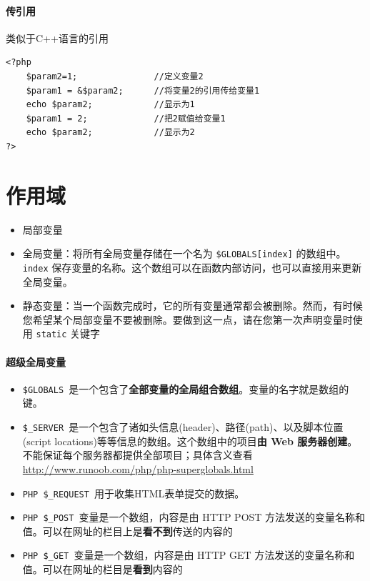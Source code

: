 \documentclass[UTF8,a4paper,12pt]{ctexbook}
\begin{document}
		\paragraph{传引用}
			类似于C++语言的引用
			
			\begin{lstlisting}
<?php    
	$param2=1;               //定义变量2    
	$param1 = &$param2;      //将变量2的引用传给变量1    
	echo $param2;            //显示为1    
	$param1 = 2;             //把2赋值给变量1    
	echo $param2;            //显示为2    
?> 
			\end{lstlisting}
			
	\section{作用域}
		\begin{itemize}
			\item 局部变量
			\item 全局变量：将所有全局变量存储在一个名为 \verb|$GLOBALS[index]| 的数组中。 \verb|index| 保存变量的名称。这个数组可以在函数内部访问，也可以直接用来更新全局变量。
			\item 静态变量：当一个函数完成时，它的所有变量通常都会被删除。然而，有时候您希望某个局部变量不要被删除。要做到这一点，请在您第一次声明变量时使用 \verb|static| 关键字
		\end{itemize}
	
		\paragraph{超级全局变量}
			\begin{itemize}
				\item \verb|$GLOBALS |是一个包含了\textbf{全部变量的全局组合数组}。变量的名字就是数组的键。
				\item \verb|$_SERVER |是一个包含了诸如头信息(header)、路径(path)、以及脚本位置(script locations)等等信息的数组。这个数组中的项目\textbf{由 Web 服务器创建}。不能保证每个服务器都提供全部项目；具体含义查看\url{http://www.runoob.com/php/php-superglobals.html}
				\item \verb|PHP $_REQUEST |用于收集HTML表单提交的数据。
				\item \verb|PHP $_POST |变量是一个数组，内容是由 HTTP POST 方法发送的变量名称和值。可以在网址的栏目上是\textbf{看不到}传送的内容的
				\item \verb|PHP $_GET |变量是一个数组，内容是由 HTTP GET 方法发送的变量名称和值。可以在网址的栏目是\textbf{看到}内容的
			\end{itemize}
		
\end{document}
